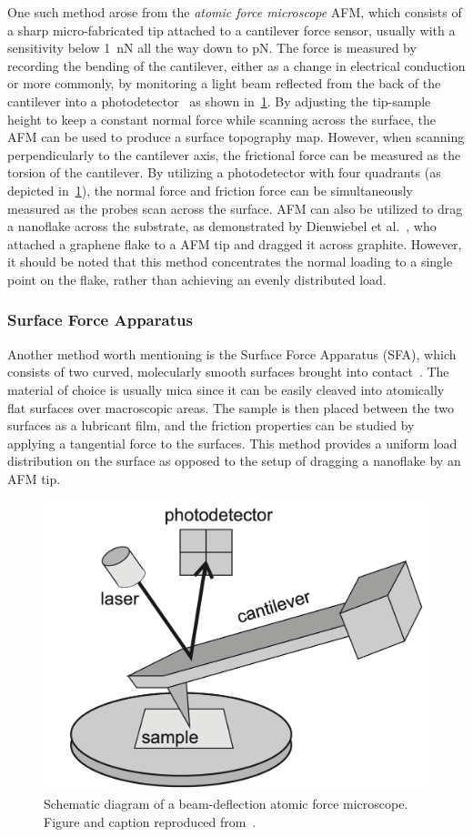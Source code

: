 One such method arose from the \textit{atomic force microscope} \acrshort{AFM}, which consists of a sharp micro-fabricated tip attached to a cantilever force sensor, usually with a sensitivity below \SI{1}{nN} all the way down to pN. The force is measured by recording the bending of
the cantilever, either as a change in electrical conduction or more commonly, by monitoring a light beam reflected from the back of the cantilever into a photodetector~\cite[p. 183]{gnecco_meyer_2015} as shown in~\cref{fig:AFM}. By adjusting the tip-sample height to keep a constant normal force while scanning across the surface, the \acrshort{AFM} can be used to produce a
surface topography map.  However, when scanning perpendicularly to the cantilever axis, the frictional force can be measured as the torsion of the cantilever. By utilizing a photodetector with four quadrants (as depicted in~\cref{fig:AFM}), the normal force and friction force can be simultaneously measured as the probes scan across the surface. \acrshort{AFM} can also be utilized to drag a nanoflake across the substrate, as demonstrated by Dienwiebel et al.~\cite{DIENWIEBEL2005197}, who attached a graphene flake to a \acrshort{AFM} tip and dragged it across graphite. However, it should be noted that this method concentrates the normal loading to a single point on the flake, rather than achieving an evenly distributed load.


\subsubsection{Surface Force Apparatus}
Another method worth mentioning is the Surface Force Apparatus (\acrshort{SFA}), which consists of two curved, molecularly smooth surfaces brought into contact~\cite[p. 188]{gnecco_meyer_2015}. The material of choice is usually mica since it can be easily cleaved into atomically flat surfaces over macroscopic areas. The sample is then placed between the two surfaces as a lubricant film, and the friction properties can be studied by applying a tangential force to the surfaces. This method provides a uniform load distribution on the surface as opposed to the setup of dragging a nanoflake by an \acrshort{AFM} tip.

\begin{figure}[!htb]
  \centering
  \includegraphics[width=0.5\linewidth]{figures/theory/AFM.png}
  \caption{Schematic diagram of a beam-deflection atomic force microscope. Figure and caption reproduced from~\cite[p. 184]{gnecco_meyer_2015}.}
  \label{fig:AFM}
\end{figure}



